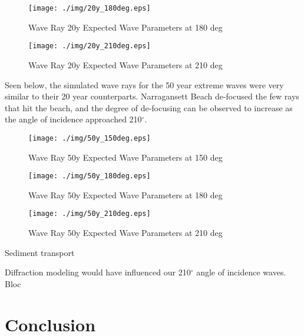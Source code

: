 \begin{figure}[H]
\centering
\texttt{[image: ./img/20y\_180deg.eps]}
\caption{Wave Ray 20y Expected Wave Parameters at 180 deg}
\label{fig:20y180deg}
\end{figure}

\begin{figure}[H]
\centering
\texttt{[image: ./img/20y\_210deg.eps]}
\caption{Wave Ray 20y Expected Wave Parameters at 210 deg}
\label{fig20y210deg}
\end{figure}

Seen below, the simulated wave rays for the 50 year extreme waves were very similar to their 20 year counterparts. Narragansett Beach de-focused the few rays that hit the beach, and the degree of de-focusing can be observed to increase as the angle of incidence approached 210$^{\circ}$.

\begin{figure}[H]
\centering
\texttt{[image: ./img/50y\_150deg.eps]}
\caption{Wave Ray 50y Expected Wave Parameters at 150 deg}
\label{fig:50y150deg}
\end{figure}

\begin{figure}[H]
\centering
\texttt{[image: ./img/50y\_180deg.eps]}
\caption{Wave Ray 50y Expected Wave Parameters at 180 deg}
\label{fig:50y180deg}
\end{figure}

\begin{figure}[H]
\centering
\texttt{[image: ./img/50y\_210deg.eps]}
\caption{Wave Ray 50y Expected Wave Parameters at 210 deg}
\label{fig:50y210deg}
\end{figure}

Sediment transport 


Diffraction modeling would have influenced our 210$^{\circ}$ angle of incidence waves. Bloc

\section{Conclusion}